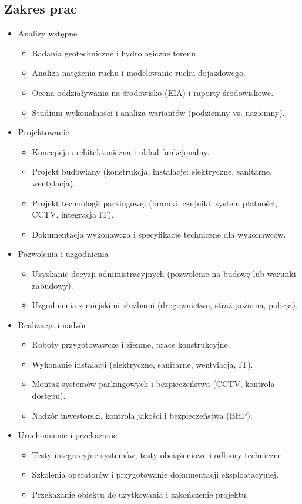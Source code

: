 \documentclass[a4paper,12pt]{article}
\begin{document}
\subsection*{Zakres prac}
\begin{itemize}
    \item Analizy wstępne
    \begin{itemize}
        \item Badania geotechniczne i hydrologiczne terenu.
        \item Analiza natężenia ruchu i modelowanie ruchu dojazdowego.
        \item Ocena oddziaływania na środowisko (EIA) i raporty środowiskowe.
        \item Studium wykonalności i analiza wariantów (podziemny vs. naziemny).
    \end{itemize}
    \item Projektowanie
    \begin{itemize}
        \item Koncepcja architektoniczna i układ funkcjonalny.
        \item Projekt budowlany (konstrukcja, instalacje: elektryczne, sanitarne, wentylacja).
        \item Projekt technologii parkingowej (bramki, czujniki, system płatności, CCTV, integracja IT).
        \item Dokumentacja wykonawcza i specyfikacje techniczne dla wykonawców.
    \end{itemize}
    \item Pozwolenia i uzgodnienia
    \begin{itemize}
        \item Uzyskanie decyzji administracyjnych (pozwolenie na budowę lub warunki zabudowy).
        \item Uzgodnienia z miejskimi służbami (drogownictwo, straż pożarna, policja).
    \end{itemize}
    \item Realizacja i nadzór
    \begin{itemize}
        \item Roboty przygotowawcze i ziemne, prace konstrukcyjne.
        \item Wykonanie instalacji (elektryczne, sanitarne, wentylacja, IT).
        \item Montaż systemów parkingowych i bezpieczeństwa (CCTV, kontrola dostępu).
        \item Nadzór inwestorski, kontrola jakości i bezpieczeństwa (BHP).
    \end{itemize}
    \item Uruchomienie i przekazanie
    \begin{itemize}
        \item Testy integracyjne systemów, testy obciążeniowe i odbiory techniczne.
        \item Szkolenia operatorów i przygotowanie dokumentacji eksploatacyjnej.
        \item Przekazanie obiektu do użytkowania i zakończenie projektu.
    \end{itemize}
\end{itemize}
\end{document}
